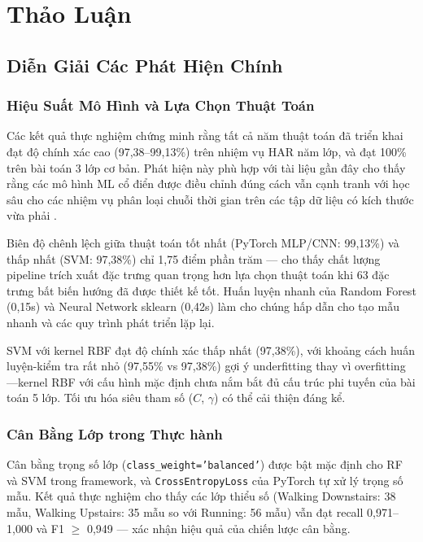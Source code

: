 \chapter{Thảo Luận}
\label{chap:discussion}

\section{Diễn Giải Các Phát Hiện Chính}

\subsection{Hiệu Suất Mô Hình và Lựa Chọn Thuật Toán}
Các kết quả thực nghiệm chứng minh rằng tất cả năm thuật toán đã triển khai đạt độ chính xác cao (97,38--99,13\%) trên nhiệm vụ HAR năm lớp, và đạt 100\% trên bài toán 3 lớp cơ bản. Phát hiện này phù hợp với tài liệu gần đây cho thấy rằng các mô hình ML cổ điển được điều chỉnh đúng cách vẫn cạnh tranh với học sâu cho các nhiệm vụ phân loại chuỗi thời gian trên các tập dữ liệu có kích thước vừa phải \cite{anguita2013har, banos2014wisdm}.

Biên độ chênh lệch giữa thuật toán tốt nhất (PyTorch MLP/CNN: 99,13\%) và thấp nhất (SVM: 97,38\%) chỉ 1,75 điểm phần trăm --- cho thấy chất lượng pipeline trích xuất đặc trưng quan trọng hơn lựa chọn thuật toán khi 63 đặc trưng bất biến hướng đã được thiết kế tốt. Huấn luyện nhanh của Random Forest (0,15s) và Neural Network sklearn (0,42s) làm cho chúng hấp dẫn cho tạo mẫu nhanh và các quy trình phát triển lặp lại.

SVM với kernel RBF đạt độ chính xác thấp nhất (97,38\%), với khoảng cách huấn luyện-kiểm tra rất nhỏ (97,55\% vs 97,38\%) gợi ý underfitting thay vì overfitting---kernel RBF với cấu hình mặc định chưa nắm bắt đủ cấu trúc phi tuyến của bài toán 5 lớp. Tối ưu hóa siêu tham số ($C$, $\gamma$) có thể cải thiện đáng kể.

\subsection{Cân Bằng Lớp trong Thực hành}
Cân bằng trọng số lớp (\texttt{class\_weight='balanced'}) được bật mặc định cho RF và SVM trong framework, và \texttt{CrossEntropyLoss} của PyTorch tự xử lý trọng số mẫu. Kết quả thực nghiệm cho thấy các lớp thiểu số (Walking Downstairs: 38 mẫu, Walking Upstairs: 35 mẫu so với Running: 56 mẫu) vẫn đạt recall 0,971--1,000 và F1 $\geq$ 0,949 --- xác nhận hiệu quả của chiến lược cân bằng.

